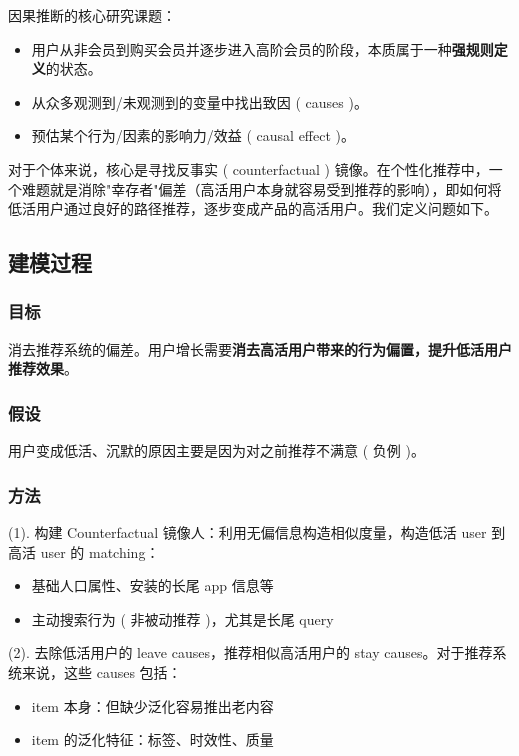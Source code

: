 \documentclass[12pt]{article}
\begin{document}
因果推断的核心研究课题：
\begin{itemize}
\setlength{\itemsep}{0pt}
\setlength{\parsep}{0pt}
\setlength{\parskip}{0pt}
    \item 用户从非会员到购买会员并逐步进入高阶会员的阶段，本质属于一种\textbf{强规则定义}的状态。
    \item 从众多观测到/未观测到的变量中找出致因 ( causes )。
    \item 预估某个行为/因素的影响力/效益 ( causal effect )。
\end{itemize}

对于个体来说，核心是寻找反事实 ( counterfactual ) 镜像。在个性化推荐中，一个难题就是消除"幸存者"偏差（高活用户本身就容易受到推荐的影响），即如何将低活用户通过良好的路径推荐，逐步变成产品的高活用户。我们定义问题如下。

\subsection{建模过程}
\subsubsection{目标}
消去推荐系统的偏差。用户增长需要\textbf{消去高活用户带来的行为偏置，提升低活用户推荐效果}。

\subsubsection{假设}
用户变成低活、沉默的原因主要是因为对之前推荐不满意 ( 负例 )。

\subsubsection{方法}
 (1). 构建 Counterfactual 镜像人：利用无偏信息构造相似度量，构造低活 user 到高活 user 的 matching：
\begin{itemize}
\setlength{\itemsep}{0pt}
\setlength{\parsep}{0pt}
\setlength{\parskip}{0pt}
    \item 基础人口属性、安装的长尾 app 信息等
    \item 主动搜索行为 ( 非被动推荐 )，尤其是长尾 query
\end{itemize}

(2). 去除低活用户的 leave causes，推荐相似高活用户的 stay causes。对于推荐系统来说，这些 causes 包括：
\begin{itemize}
\setlength{\itemsep}{0pt}
\setlength{\parsep}{0pt}
\setlength{\parskip}{0pt}
    \item item 本身：但缺少泛化容易推出老内容
    \item item 的泛化特征：标签、时效性、质量
\end{itemize}
\end{document}
